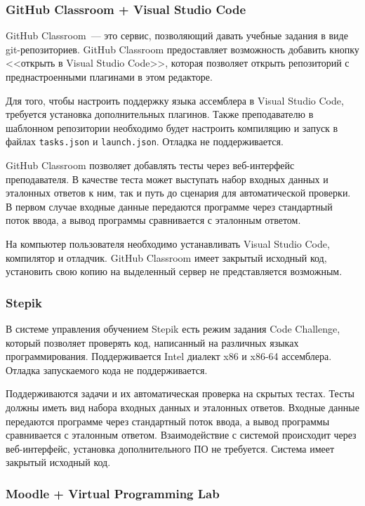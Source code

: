 \documentclass[a4paper,article,14pt]{extarticle}
\begin{document}
\subsubsection{GitHub Classroom + Visual Studio Code}

GitHub Classroom\cite{githubclassroom}~--- это сервис, позволяющий давать учебные задания в виде git-репозиториев. GitHub Classroom предоставляет возможность добавить кнопку <<открыть в Visual Studio Code>>\cite{githubclassroomvscode}, которая позволяет открыть репозиторий с преднастроенными плагинами в этом редакторе.

Для того, чтобы настроить поддержку языка ассемблера в Visual Studio Code, требуется установка дополнительных плагинов. Также преподавателю в шаблонном репозитории необходимо будет настроить компиляцию и запуск в файлах \texttt{tasks.json} и \texttt{launch.json}. Отладка не поддерживается.

GitHub Classroom позволяет добавлять тесты через веб-интерфейс преподавателя. В качестве теста может выступать набор входных данных и эталонных ответов к ним, так и путь до сценария для автоматической проверки. В первом случае входные данные передаются программе через стандартный поток ввода, а вывод программы сравнивается с эталонным ответом.

На компьютер пользователя необходимо устанавливать Visual Studio Code, компилятор и отладчик. GitHub Classroom имеет закрытый исходный код, установить свою копию на выделенный сервер не представляется возможным.

\subsubsection{Stepik}

В системе управления обучением Stepik\cite{stepik} есть режим задания Code Challenge, который позволяет проверять код, написанный на различных языках программирования. Поддерживается Intel диалект x86 и x86-64 ассемблера. Отладка запускаемого кода не поддерживается.

Поддерживаются задачи и их автоматическая проверка на скрытых тестах. Тесты должны иметь вид набора входных данных и эталонных ответов. Входные данные передаются программе через стандартный поток ввода, а вывод программы сравнивается с эталонным ответом. Взаимодействие с системой происходит через веб-интерфейс, установка дополнительного ПО не требуется. Система имеет закрытый исходный код.

\subsubsection{Moodle + Virtual Programming Lab}
\end{document}
